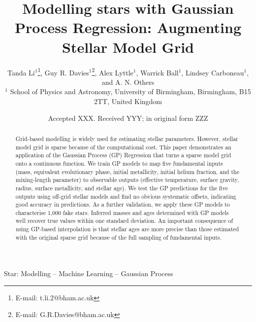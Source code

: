 \documentclass[fleqn,usenatbib]{mnras}
\title[Modelling stars with GP]{Modelling stars with Gaussian Process Regression: Augmenting Stellar Model Grid}
\author[T. Li et al.]{
Tanda Li$^{1}$\thanks{E-mail: t.li.2@bham.ac.uk},
Guy R. Davies$^{1}$\thanks{E-mail: G.R.Davies@bham.ac.uk},
Alex Lyttle$^{1}$,
Warrick Ball$^{1}$,
Lindsey Carboneau$^{1}$,
and A. N. Others
\\
$^{1}$ School of Physics and Astronomy, University of Birmingham, Birmingham, B15 2TT, United Kingdom\\
}
\date{Accepted XXX. Received YYY; in original form ZZZ}
\begin{document}
\label{firstpage}
\pagerange{\pageref{firstpage}--\pageref{lastpage}}
\maketitle

\begin{abstract}
Grid-based modelling is widely used for estimating stellar parameters. However, stellar model grid is sparse because of the computational cost. This paper demonstrates an application of the Gaussian Process (GP) Regression that turns a sparse model grid onto a continuous function. We train GP models to map five fundamental inputs (mass, equivalent evolutionary phase, initial metallicity, initial helium fraction, and the mixing-length parameter) to observable outputs (effective temperature, surface gravity, radius, surface metallicity, and stellar age). 
%
%
We test the GP predictions for the five outputs using off-grid stellar models and find no obvious systematic offsets, indicating good accuracy in predictions. %
%
As a further validation, we apply these GP models to characterise 1,000 fake stars. Inferred masses and ages determined with GP models well recover true values within one standard deviation. 
An important consequence of using GP-based interpolation is that stellar ages are more precise than those estimated with the original sparse grid because of the full sampling of fundamental inputs.
%
\end{abstract}

\begin{keywords}
Star: Modelling -- Machine Learning -- Gaussian Process
\end{keywords}
\end{document}
